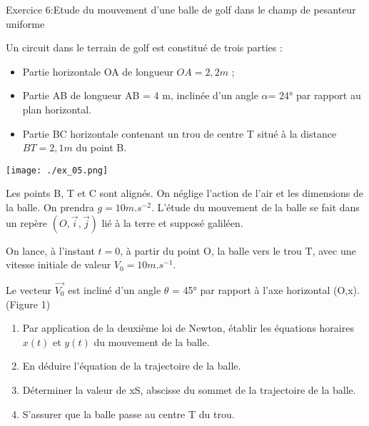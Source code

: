 \documentclass[12pt, french]{article}
\begin{document}
\begin{Box2}{Exercice 6:Etude du mouvement d’une balle de golf dans le champ de pesanteur uniforme }

Un circuit dans le terrain de golf est constitué de trois parties :
\begin{itemize}
	\item Partie horizontale OA de longueur $OA = 2,2 m$ ;
	\item Partie AB de longueur AB = 4 m, inclinée d’un angle $\alpha$= 24° par rapport au plan
horizontal.
\item Partie BC horizontale contenant un trou de centre T situé à la distance $BT = 2,1 m$
du point B.
\end{itemize}

\begin{center}
	\texttt{[image: ./ex\_05.png]}
  \end{center}

Les points B, T et C sont alignés.
On néglige l’action de l’air et les dimensions de la balle. On prendra $g = 10 m.s^{-2}$.
L’étude du mouvement de la balle se fait dans un repère $(O,\vec{i}, \vec{j})$ lié à la terre et
supposé galiléen.

On lance, à l’instant $t = 0$, à
partir du point O, la balle vers le
trou T, avec une vitesse initiale
de valeur $V_0 = 10 m.s^{-1}$.

Le vecteur $\vec{V_0}$ est incliné d’un
angle $\theta$ = 45° par rapport à l’axe
horizontal (O,x).(Figure 1)

\begin{enumerate}
	\item Par application de la deuxième loi de Newton, établir les équations horaires
$x(t)$ et $y(t)$ du mouvement de la balle.
\item En déduire l’équation de la trajectoire de la balle.
\item Déterminer la valeur de xS, abscisse du sommet de la trajectoire de la balle.
\item  S’assurer que la balle passe au centre T du trou.
\end{enumerate}


\end{Box2}

\end{document}
